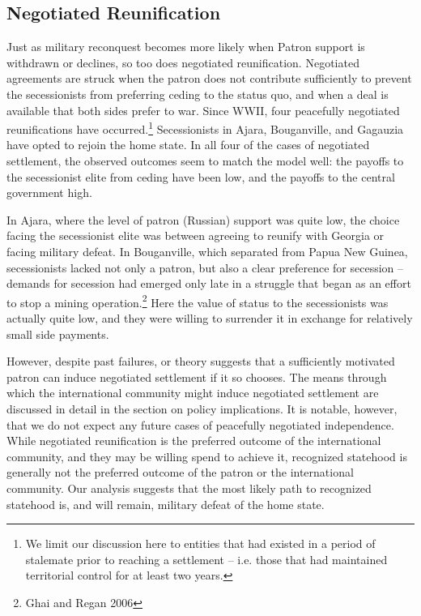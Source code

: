 \documentclass[12pt,letterpaper, notitlepage]{article}
\begin{document}
\subsection*{Negotiated Reunification}

Just as military reconquest becomes more likely when Patron support is withdrawn or declines, so too does negotiated reunification. Negotiated agreements are struck when the patron does not contribute sufficiently to prevent the secessionists from preferring ceding to the status quo, and when a deal is available that both sides prefer to war. Since WWII, four peacefully negotiated reunifications have occurred.\footnote{We limit our discussion here to entities that had existed in a period of stalemate prior to reaching a settlement -- i.e. those that had maintained territorial control for at least two years.} Secessionists in Ajara, Bouganville, and Gagauzia have opted to rejoin the home state.  In all four of the cases of negotiated settlement, the observed outcomes seem to match the model well: the payoffs to the secessionist elite from ceding have been low, and the payoffs to the central government high.

In Ajara, where the level of patron (Russian) support was quite low, the choice facing the secessionist elite was between agreeing to reunify with Georgia or facing military defeat. In Bouganville, which separated from Papua New Guinea, secessionists lacked not only a patron, but also a clear preference for secession -- demands for secession had emerged only late in a struggle that began as an effort to stop a mining operation.\footnote{Ghai and Regan 2006}  Here the value of status to the secessionists was actually quite low, and they were willing to surrender it in exchange for relatively small side payments.

However, despite past failures, or theory suggests that a sufficiently motivated patron can induce negotiated settlement if it so chooses. The means through which the international community might induce negotiated settlement are discussed in detail in the section on policy implications. It is notable, however, that we do not expect any future cases of peacefully negotiated independence.  While negotiated reunification is the preferred outcome of the international community, and they may be willing spend to achieve it, recognized statehood is generally not the preferred outcome of the patron or the international community. Our analysis suggests that the most likely path to recognized statehood is, and will remain, military defeat of the home state.
\end{document}
